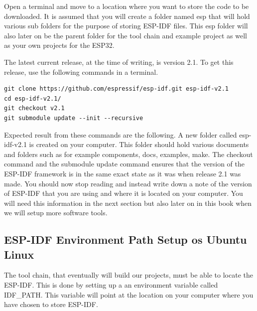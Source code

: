 \documentclass{tufte-book}
\begin{document}
Open a terminal and move to a location where you want to store the code to be downloaded. It is assumed that you will create a folder named esp that will hold various sub folders for the purpose of storing ESP-IDF files. This esp folder will also later on be the parent folder for the tool chain and example project as well as your own projects for the ESP32.


The latest current release, at the time of writing, is version 2.1. To get this release, use the following commands in a terminal.

\begin{lstlisting}
git clone https://github.com/espressif/esp-idf.git esp-idf-v2.1
cd esp-idf-v2.1/
git checkout v2.1
git submodule update --init --recursive
\end{lstlisting}

Expected result from these commands are the following. A new folder called esp-idf-v2.1 is created on your computer. This folder should hold various documents and folders such as for example components, docs, examples, make. The checkout command and the submodule update command ensures that the version of the ESP-IDF framework is in the same exact state as it was when release 2.1 was made.
You should now stop reading and instead write down a note of the version of ESP-IDF that you are using and where it is located on your computer. You will need this information in the next section but also later on in this book when we will setup more software tools.

\subsection{ESP-IDF Environment Path Setup os Ubuntu Linux}


The tool chain, that eventually will build our projects, must be able to locate the ESP-IDF. This is done by setting up a an environment variable called IDF\_PATH. This variable will point at the location on your computer where you have chosen to store ESP-IDF.
\end{document}
